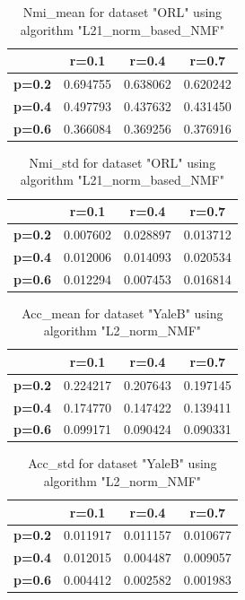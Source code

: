 \begin{table}[p]
\centering
\begin{tabular}{|c|c|c|c|}
\hline
 & \textbf{r=0.1} & \textbf{r=0.4} & \textbf{r=0.7} \\
\hline
\textbf{p=0.2} & 0.694755 & 0.638062 & 0.620242 \\
\hline
\textbf{p=0.4} & 0.497793 & 0.437632 & 0.431450 \\
\hline
\textbf{p=0.6} & 0.366084 & 0.369256 & 0.376916 \\
\hline
\end{tabular}
\caption{Nmi\_mean for dataset "ORL" using algorithm "L21\_norm\_based\_NMF"}
\end{table}

\begin{table}[p]
\centering
\begin{tabular}{|c|c|c|c|}
\hline
 & \textbf{r=0.1} & \textbf{r=0.4} & \textbf{r=0.7} \\
\hline
\textbf{p=0.2} & 0.007602 & 0.028897 & 0.013712 \\
\hline
\textbf{p=0.4} & 0.012006 & 0.014093 & 0.020534 \\
\hline
\textbf{p=0.6} & 0.012294 & 0.007453 & 0.016814 \\
\hline
\end{tabular}
\caption{Nmi\_std for dataset "ORL" using algorithm "L21\_norm\_based\_NMF"}
\end{table}

\begin{table}[p]
\centering
\begin{tabular}{|c|c|c|c|}
\hline
 & \textbf{r=0.1} & \textbf{r=0.4} & \textbf{r=0.7} \\
\hline
\textbf{p=0.2} & 0.224217 & 0.207643 & 0.197145 \\
\hline
\textbf{p=0.4} & 0.174770 & 0.147422 & 0.139411 \\
\hline
\textbf{p=0.6} & 0.099171 & 0.090424 & 0.090331 \\
\hline
\end{tabular}
\caption{Acc\_mean for dataset "YaleB" using algorithm "L2\_norm\_NMF"}
\end{table}

\begin{table}[p]
\centering
\begin{tabular}{|c|c|c|c|}
\hline
 & \textbf{r=0.1} & \textbf{r=0.4} & \textbf{r=0.7} \\
\hline
\textbf{p=0.2} & 0.011917 & 0.011157 & 0.010677 \\
\hline
\textbf{p=0.4} & 0.012015 & 0.004487 & 0.009057 \\
\hline
\textbf{p=0.6} & 0.004412 & 0.002582 & 0.001983 \\
\hline
\end{tabular}
\caption{Acc\_std for dataset "YaleB" using algorithm "L2\_norm\_NMF"}
\end{table}

